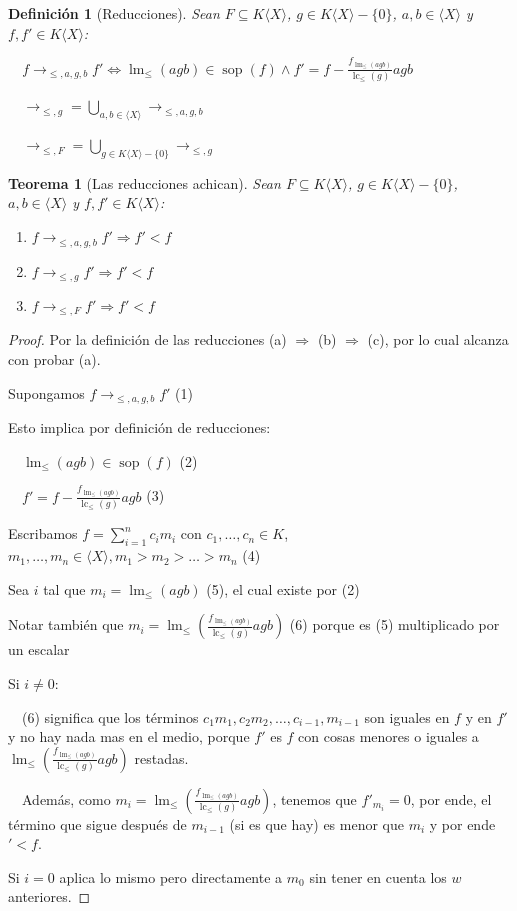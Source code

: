 \documentclass{amsbook}
\theoremstyle{customstyle}
\newtheorem{definition}{Definición}[section]
\newtheorem{theorem}{Teorema}[section]
\DeclareMathOperator{\sop}{sop}
\DeclareMathOperator{\lm}{lm}
\DeclareMathOperator{\lc}{lc}
\begin{document}
\begin{definition}[Reducciones]
Sean $F ⊆ K⟨X⟩$, $g ∈ K⟨X⟩ - \{0\}$, $a, b ∈ ⟨X⟩$ y $f, f' ∈ K⟨X⟩$:

  $f →_{≤, a, g, b} f' ⇔ \lm_≤(agb) ∈ \sop(f) ∧ f' = f - \frac{f_{\lm_≤(agb)}}{\lc_≤(g)}agb$

  $→_{≤, g} = \bigcup_{a, b ∈ ⟨X⟩} →_{≤, a, g, b}$

  $→_{≤, F} = \bigcup_{g ∈ K⟨X⟩ - \{0\}} →_{≤, g}$
\end{definition}

\begin{theorem}[Las reducciones achican]\label{thm:→ achican}
Sean $F ⊆ K⟨X⟩$, $g ∈ K⟨X⟩ - \{0\}$, $a, b ∈ ⟨X⟩$ y $f, f' ∈ K⟨X⟩$:
\begin{enumerate}[label = (\alph*)]
\item $f →_{≤, a, g, b} f' ⇒ f' < f$

\item $f →_{≤, g} f' ⇒ f' < f$

\item $f →_{≤, F} f' ⇒ f' < f$
\end{enumerate}
\end{theorem}
\begin{proof}
Por la definición de las reducciones (a) $⇒$ (b) $⇒$ (c), por lo cual alcanza con probar (a).

Supongamos $f →_{≤, a, g, b} f'$ (1)

Esto implica por definición de reducciones:

  $\lm_≤(agb) ∈ \sop(f)$ (2)

  $f' = f - \frac{f_{\lm_≤(agb)}}{\lc_≤(g)}agb$ (3)

Escribamos $f = \sum_{i = 1}^n c_i m_i$ con $c_1, …, c_n ∈ K$, $m_1, …, m_n ∈ ⟨X⟩, m_1 > m_2 > … > m_n$ (4)

Sea $i$ tal que $m_i = \lm_≤(agb)$ (5), el cual existe por (2)

Notar también que $m_i = \lm_≤(\frac{f_{\lm_≤(agb)}}{\lc_≤(g)}agb)$ (6) porque es (5) multiplicado por un escalar

Si $i ≠ 0$:

  (6) significa que los términos $c_1 m_1, c_2 m_2, …, c_{i-1}, m_{i-1}$ son iguales en $f$ y en $f'$ y no hay nada mas en el medio, porque $f'$ es $f$ con cosas menores o iguales a $\lm_≤(\frac{f_{\lm_≤(agb)}}{\lc_≤(g)}agb)$ restadas.

  Además, como $m_i = \lm_≤(\frac{f_{\lm_≤(agb)}}{\lc_≤(g)}agb)$, tenemos que $f'_{m_i} = 0$, por ende, el término que sigue después de $m_{i-1}$ (si es que hay) es menor que $m_i$ y por ende $' < f$.

Si $i = 0$ aplica lo mismo pero directamente a $m_0$ sin tener en cuenta los $w$ anteriores.

\end{proof}
\end{document}
